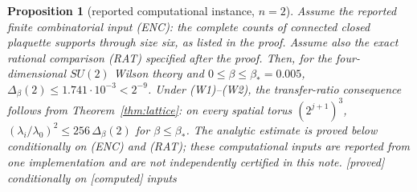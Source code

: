 \documentclass[11pt,a4paper]{article}
\theoremstyle{plain}
\newtheorem{proposition}[theorem]{Proposition}
\theoremstyle{definition}
\theoremstyle{remark}
\numberwithin{equation}{section}
\newcommand{\st}[1]{\textsf{[#1]}}
\newcommand{\BETASTAR}{0.005}
\newcommand{\DELTABOUND}{1.741\cdot10^{-3}}
\begin{document}
\begin{proposition}[reported computational instance, $n=2$]\label{prop:instance}
Assume the reported finite combinatorial input (ENC): the complete counts of connected closed plaquette supports through size six, as listed in the proof. Assume also
the exact rational comparison (RAT) specified after the proof. Then, for the four-dimensional $SU(2)$ Wilson theory and $0\le\beta\le\beta_*=\BETASTAR$,
$\Delta_\beta(2)\le\DELTABOUND<2^{-9}$. Under (W1)--(W2), the transfer-ratio consequence follows from Theorem~\ref{thm:lattice}: on every spatial torus $(2^{j+1})^3$,
$(\lambda_i/\lambda_0)^2\le256\,\Delta_\beta(2)$ for $\beta\le\beta_*$. The analytic estimate is proved below conditionally on (ENC) and (RAT); these computational inputs
are reported from one implementation and are not independently certified in this note. \st{proved} conditionally on \st{computed} inputs
\end{proposition}
\end{document}
